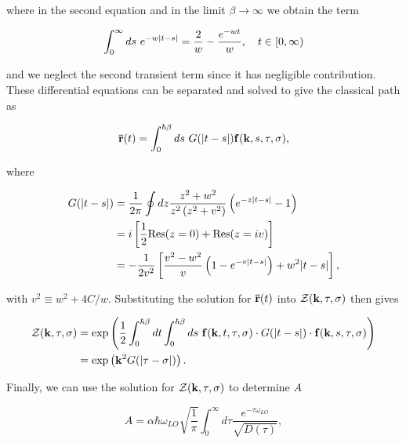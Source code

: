 where in the second equation and in the limit $\beta \to \infty$ we obtain the term

\begin{equation}
    \int^\infty_0 ds\ e^{-w\abs{t-s}} = \frac{2}{w} - \frac{e^{-wt}}{w}, \quad t \in [0, \infty)
\end{equation}

and we neglect the second transient term since it has negligible contribution. These differential equations can be separated and solved to give the classical path as

\begin{equation}
    \vb{\bar{r}}(t) = \int^{\hbar\beta}_0 ds\ G(\abs{t-s}) \vb{f}(\vb{k}, s, \tau, \sigma),
\end{equation}

where

\begin{equation}
\begin{aligned}
    G(\abs{t-s}) &= \frac{1}{2\pi} \oint dz \frac{z^2 + w^2}{z^2 \left(z^2 + v^2\right)} \left(e^{-z\abs{t-s}}-1\right) \\
    &= i \left[\frac{1}{2} \mathrm{Res}(z=0) + \mathrm{Res}(z = iv) \right] \\
    &= -\frac{1}{2v^2} \left[ \frac{v^2-w^2}{v}\left(1 - e^{-v\abs{t-s}}\right) + w^2 \abs{t-s} \right],
\end{aligned}
\end{equation}

with $v^2 \equiv w^2 + 4C/w$. Substituting the solution for $\vb{\bar{r}}(t)$ into $\mathcal{Z}(\vb{k}, \tau, \sigma)$ then gives

\begin{equation}
    \begin{aligned}
        \mathcal{Z}(\vb{k}, \tau, \sigma) &= \exp\left( \frac{1}{2} \int^{\hbar\beta}_0 dt \int^{\hbar\beta}_0 ds\ \vb{f}(\vb{k}, t, \tau, \sigma) \cdot  G(\abs{t-s}) \cdot \vb{f}(\vb{k}, s, \tau, \sigma) \right) \\
        &= \exp \left( \vb{k}^2 G(\abs{\tau - \sigma}) \right).
    \end{aligned}
\end{equation}

Finally, we can use the solution for $\mathcal{Z}(\vb{k}, \tau, \sigma)$ to determine $A$

\begin{equation}
    A = \alpha\hbar\omega_{LO}\sqrt{\frac{1}{\pi}}\int^{\infty}_0 d\tau \frac{e^{-\tau \omega_{LO}}}{\sqrt{ D(\tau)}},
\end{equation}

